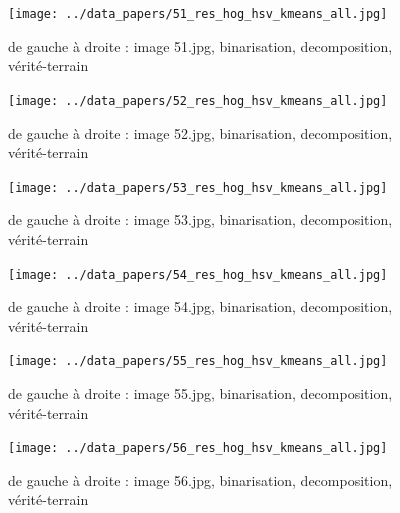 \documentclass{book}
\begin{document}
\begin{figure}[H]
\begin{center}
\texttt{[image: ../data\_papers/51\_res\_hog\_hsv\_kmeans\_all.jpg]}
\end{center}
\caption{de gauche à droite : image 51.jpg, binarisation, decomposition, vérité-terrain}
\label{51}
\end{figure}
\clearpage


\begin{figure}[H]
\begin{center}
\texttt{[image: ../data\_papers/52\_res\_hog\_hsv\_kmeans\_all.jpg]}
\end{center}
\caption{de gauche à droite : image 52.jpg, binarisation, decomposition, vérité-terrain}
\label{52}
\end{figure}
\clearpage


\begin{figure}[H]
\begin{center}
\texttt{[image: ../data\_papers/53\_res\_hog\_hsv\_kmeans\_all.jpg]}
\end{center}
\caption{de gauche à droite : image 53.jpg, binarisation, decomposition, vérité-terrain}
\label{53}
\end{figure}
\clearpage


\begin{figure}[H]
\begin{center}
\texttt{[image: ../data\_papers/54\_res\_hog\_hsv\_kmeans\_all.jpg]}
\end{center}
\caption{de gauche à droite : image 54.jpg, binarisation, decomposition, vérité-terrain}
\label{54}
\end{figure}
\clearpage


\begin{figure}[H]
\begin{center}
\texttt{[image: ../data\_papers/55\_res\_hog\_hsv\_kmeans\_all.jpg]}
\end{center}
\caption{de gauche à droite : image 55.jpg, binarisation, decomposition, vérité-terrain}
\label{55}
\end{figure}
\clearpage


\begin{figure}[H]
\begin{center}
\texttt{[image: ../data\_papers/56\_res\_hog\_hsv\_kmeans\_all.jpg]}
\end{center}
\caption{de gauche à droite : image 56.jpg, binarisation, decomposition, vérité-terrain}
\label{56}
\end{figure}
\clearpage
\end{document}
